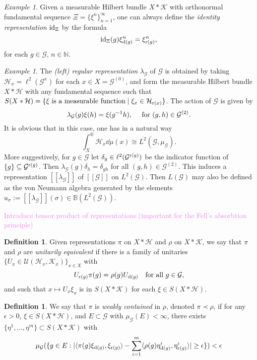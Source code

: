\documentclass[a4paper,11pt]{article}
\numberwithin{equation}{section}
\theoremstyle{definition}
\newtheorem{defn}[thm]{Definition}
\theoremstyle{remark}
\newtheorem{ex}[thm]{Example}
\numberwithin{equation}{section}
\newcommand{\rG}{\mathcal{G}}
\def\N{\mathbb{N}}
\def\H{\mathcal H}
\def\K{\mathcal K}
\newcommand{\U}{\mathcal{U}}
\def\sub{\subseteq}
\def\r{{\rm r}}
\def\d{{\rm d}}
\def\<{\langle}
\def\>{\rangle}
\numberwithin{equation}{section}
\begin{document}
\begin{ex}
Given a measurable Hilbert bundle $X \ast \K$ with orthonormal fundamental sequence $\Xi=\{\xi^n\}_{n=1}^\infty$, one can always define the {\it identity representation} ${\rm id}_\Xi$ by the formula 
$$
{\rm id}_\Xi(g)\xi^n_{\d(g)}=\xi^n_{\r(g)},
$$ for each $g\in\rG$, $n\in\N$.
\end{ex}

\begin{ex} \label{leftreg}
The {\it (left) regular representation} $\lambda_\rG$ of $\rG$ is obtained by taking $\H_x = \ell^2(\rG^x)$ for each $x \in X=\rG^{(0)}$, and form the measurable Hilbert bundle $X \ast \H$ with any fundamental sequence such that $S(X \ast \H)=\{\xi\textup{ is a measurable function}\mid \xi_x\in \H_{\r(x)}\}$. The action of $\rG$ is given by 
$$
\lambda_\rG(g)\xi(h)=\xi(g^{-1}h),\quad\textup{ for } (g,h)\in\rG^{(2)}. 
$$  It is obvious that in this case, one has in a natural way $$
\int_X^\oplus \H_x\dd \mu(x)\cong L^2(\rG,\mu_\rG). 
$$ 
More suggestively, for $ g\in \rG $ let $ \delta_{g}\in \ell^{2}(\rG^{\r(g)}) $ be the indicator function of $ \{g\}\sub \rG^{\r(g)}$. Then $ \lambda_\rG(g) \delta_{h} = \delta_{gh} $ for all $ (g,h)\in \rG^{(2)} $. This induces a representation $ [[\lambda_\rG]] $ of $ [[\rG]] $ on $ L^{2}(\rG) $. Then $ L(\rG) $ may also be defined as the von Neumann algebra generated by the elements $ u_{\sigma} := [[\lambda_\rG]](\sigma)\in \mathbb B(L^{2}(\rG)) $.
\end{ex}

\textcolor{violet}{Introduce tensor product of representations (important for the Fell's absorbtion principle)}

\begin{defn} \label{equiv}
Given representations $\pi$ on $X \ast \H$ and $\rho$ on $X \ast \K$, we say that $\pi$ and $\rho$ are {\it unitarily equivalent} if there is a family of unitaries $\{U_x \in \U(\H_x, \K_x)\}_{x \in X}$ with 
$$
U_{\r(g)}\pi(g) = \rho(g)U_{\d(g)} \quad \text{for all }g \in \rG,
$$
and such that $x \mapsto U_x\xi_x$ is in $S(X \ast \K)$ for each $\xi \in S(X \ast \H)$. 
\end{defn}

\begin{defn}\label{weakcont}
We say that $\pi$ is {\it weakly contained} in $\rho$, denoted $\pi \prec \rho$, if for any $\epsilon > 0$, $\xi \in S(X \ast \H)$, and $E \subset \rG$ with $\mu_\rG(E) < \infty$, there exists $\{\eta^1, \dots, \eta^m\} \subset S(X \ast \K)$ with
$$
\mu_\rG(\{g\in E : |\< \pi(g)\xi_{\d(g)}, \xi_{\r(g)} \> - \sum_{i = 1}^m \< \rho(g)\eta^i_{\d(g)}, \eta^i_{\r(g)} \>| \ge \epsilon\}) < \epsilon  
$$ 
\end{defn}
\end{document}
